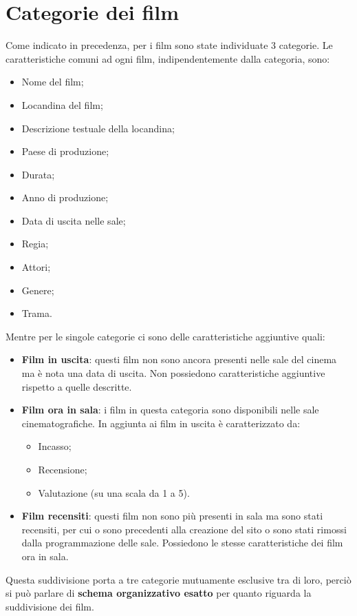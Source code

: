 \documentclass[../Relazione.tex]{subfiles}
\begin{document}
\section{Categorie dei film}

Come indicato in precedenza, per i film sono state individuate 3 categorie. Le caratteristiche comuni ad ogni film, indipendentemente dalla categoria, sono:

\begin{itemize}

\item Nome del film;
\item Locandina del film;
\item Descrizione testuale della locandina;
\item Paese di produzione;
\item Durata;
\item Anno di produzione;
\item Data di uscita nelle sale;
\item Regia;
\item Attori;
\item Genere;
\item Trama.

\end{itemize}

Mentre per le singole categorie ci sono delle caratteristiche aggiuntive quali:

\begin{itemize}

\item \textbf{Film in uscita}: questi film non sono ancora presenti nelle sale del cinema ma è nota una data di uscita. Non possiedono caratteristiche aggiuntive rispetto a quelle descritte.

\item \textbf{Film ora in sala}: i film in questa categoria sono disponibili nelle sale cinematografiche. In aggiunta ai film in uscita è caratterizzato da:
\begin{itemize}
\item Incasso;
\item Recensione;
\item Valutazione (su una scala da 1 a 5).
\end{itemize}

\item \textbf{Film recensiti}: questi film non sono più presenti in sala ma sono stati recensiti, per cui o sono precedenti alla creazione del sito o sono stati rimossi dalla programmazione delle sale. Possiedono le stesse caratteristiche dei film ora in sala.

\end{itemize}

Questa suddivisione porta a tre categorie mutuamente esclusive tra di loro, perciò si può parlare di \textbf{schema organizzativo esatto} per quanto riguarda la suddivisione dei film.
\end{document}
